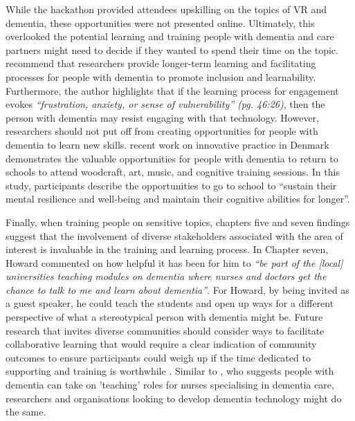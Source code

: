 While the hackathon provided attendees upskilling on the topics of VR and dementia, these opportunities were not presented online. Ultimately, this overlooked the potential learning and training people with dementia and care partners might need to decide if they wanted to spend their time on the topic. \cite{hwang2020exploring} recommend that researchers provide longer-term learning and facilitating processes for people with dementia to promote inclusion and learnability. Furthermore, the author highlights that if the learning process for engagement evokes \textit{``frustration, anxiety, or sense of vulnerability'' (pg. 46:26)}, then the person with dementia may resist engaging with that technology. However, researchers should not put off from creating opportunities for people with dementia to learn new skills. \cite{ward2020going}  recent work on innovative practice in Denmark demonstrates the valuable opportunities for people with dementia to return to schools to attend woodcraft, art, music, and cognitive training sessions. In this study, participants describe the opportunities to go to school to ``sustain their mental resilience and well-being and maintain their cognitive abilities for longer''.

Finally, when training people on sensitive topics, chapters five and seven findings suggest that the involvement of diverse stakeholders associated with the area of interest is invaluable in the training and learning process. In Chapter seven, Howard commented on how helpful it has been for him to \textit{``be part of the [local] universities teaching modules on dementia where nurses and doctors get the chance to talk to me and learn about dementia''}. For Howard, by being invited as a guest speaker, he could teach the students and open up ways for a different perspective of what a stereotypical person with dementia might be. Future research that invites diverse communities should consider ways to facilitate collaborative learning that would require a clear indication of community outcomes to ensure participants could weigh up if the time dedicated to supporting and training is worthwhile \citep{hayes2020inclusive}. Similar to \cite{skog2000patient}, who suggests people with dementia can take on 'teaching' roles for nurses specialising in dementia care, researchers and organisations looking to develop dementia technology might do the same.

